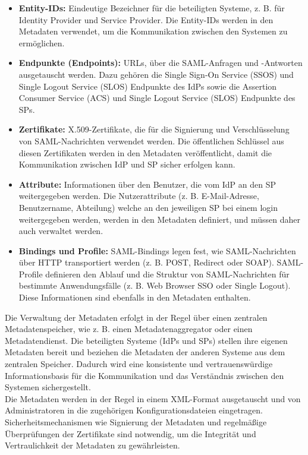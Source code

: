 \documentclass[a4paper, fontsize=12pt]{scrartcl}
\begin{document}
\begin{itemize}
    \item \textbf{Entity-IDs:} Eindeutige Bezeichner für die beteiligten Systeme, z. B. für Identity Provider und Service Provider. Die Entity-IDs werden in den Metadaten verwendet, um die Kommunikation zwischen den Systemen zu ermöglichen.
    \item \textbf{Endpunkte (Endpoints):} URLs, über die SAML-Anfragen und -Antworten ausgetauscht werden. Dazu gehören die Single Sign-On Service (SSOS) und Single Logout Service (SLOS) Endpunkte des IdPs sowie die Assertion Consumer Service (ACS) und Single Logout Service (SLOS) Endpunkte des SPs.
    \item \textbf{Zertifikate:} X.509-Zertifikate, die für die Signierung und Verschlüsselung von SAML-Nachrichten verwendet werden. Die öffentlichen Schlüssel aus diesen Zertifikaten werden in den Metadaten veröffentlicht, damit die Kommunikation zwischen IdP und SP sicher erfolgen kann.
    \item \textbf{Attribute:} Informationen über den Benutzer, die vom IdP an den SP weitergegeben werden. Die Nutzerattribute (z. B. E-Mail-Adresse, Benutzername, Abteilung) welche an den jeweiligen SP bei einem login weitergegeben werden, werden in den Metadaten definiert, und müssen daher auch verwaltet werden.
    \item \textbf{Bindings und Profile:} SAML-Bindings legen fest, wie SAML-Nachrichten über HTTP transportiert werden (z. B. POST, Redirect oder SOAP). SAML-Profile definieren den Ablauf und die Struktur von SAML-Nachrichten für bestimmte Anwendungsfälle (z. B. Web Browser SSO oder Single Logout). Diese Informationen sind ebenfalls in den Metadaten enthalten.
\end{itemize}

Die Verwaltung der Metadaten erfolgt in der Regel über einen zentralen Metadatenspeicher, wie z. B. einen Metadatenaggregator oder einen Metadatendienst. 
Die beteiligten Systeme (IdPs und SPs) stellen ihre eigenen Metadaten bereit und beziehen die Metadaten der anderen Systeme aus dem zentralen Speicher. 
Dadurch wird eine konsistente und vertrauenswürdige Informationsbasis für die Kommunikation und das Verständnis zwischen den Systemen sichergestellt.\\
Die Metadaten werden in der Regel in einem XML-Format ausgetauscht und von Administratoren in die zugehörigen Konfigurationsdateien eingetragen. 
Sicherheitsmechanismen wie Signierung der Metadaten und regelmäßige Überprüfungen der Zertifikate sind notwendig, um die Integrität und Vertraulichkeit der Metadaten zu gewährleisten.
\end{document}
